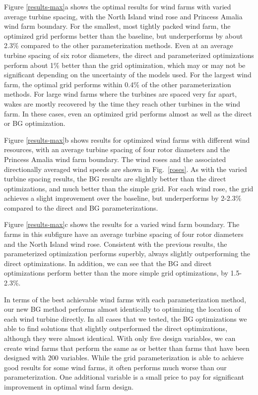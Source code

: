 \documentclass[wes, manuscript]{copernicus}
\begin{document}
Figure \ref{results-max}a shows the optimal results for wind farms with varied average turbine spacing, with the North Island wind rose and Princess Amalia wind farm boundary. For the smallest, most tightly packed wind farm, the optimized grid performs better than the baseline, but underperforms by about 2.3\% compared to the other parameterization methods. Even at an average turbine spacing of six rotor diameters, the direct and parameterized optimizations perform about 1\% better than the grid optimization, which may or may not be significant depending on the uncertainty of the models used. For the largest wind farm, the optimal grid performs within 0.4\% of the other parameterization methods. For large wind farms where the turbines are spaced very far apart, wakes are mostly recovered by the time they reach other turbines in the wind farm. In these cases, even an optimized grid performs almost as well as the direct or BG optimization.  

Figure \ref{results-max}b shows results for optimized wind farms with different wind resources, with an average turbine spacing of four rotor diameters and the Princess Amalia wind farm boundary. The wind roses and the associated directionally averaged wind speeds are shown in Fig.~\ref{roses}. 
As with the varied turbine spacing results, the BG results are slightly better than the direct optimizations, and much better than the simple grid. For each wind rose, the grid achieves a slight improvement over the baseline, but underperforms by 2-2.3\% compared to the direct and BG parameterizations.

Figure \ref{results-max}c shows the results for a varied wind farm boundary. The farms in this subfigure have an average turbine spacing of four rotor diameters and the North Island wind rose. Consistent with the previous results, the parameterized optimization performs superbly, always slightly outperforming the direct optimizations. 
In addition, we can see that the BG and direct optimizations perform better than the more simple grid optimizations, by 1.5-2.3\%.
 
In terms of the best achievable wind farms with each parameterization method, our new  BG method performs almost identically to optimizing the location of each wind turbine directly. In all cases that we tested, the BG optimizations we able to find solutions that slightly outperformed the direct optimizations, although they were almost identical.
With only five design variables, we can create wind farms that perform the same as or better than farms that have been designed with 200 variables. While the grid parameterization is able to achieve good results for some wind farms, it often performs much worse than our parameterization. One additional variable is a small price to pay for significant improvement in optimal wind farm design. 
\end{document}
